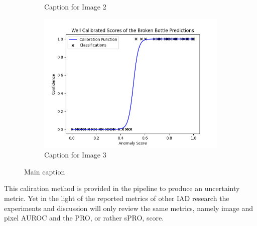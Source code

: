 \begin{figure}[htbp]
\begin{subfigure}[b]{0.3\textwidth}
        \caption{Caption for Image 2}
        \label{fig:sub2}
    \end{subfigure}
    \begin{subfigure}[b]{0.3\textwidth}
        \includegraphics[width=\textwidth]{figures/anomaly_calibration_soft.png}
        \caption{Caption for Image 3}
        \label{fig:sub3}
    \end{subfigure}
    \caption{Main caption}
    \label{fig:main}
\end{figure}

This caliration method is provided in the pipeline to produce an uncertainty metric. Yet in the light of the reported metrics of other IAD research the experiments and discussion will only 
review the same metrics, namely image and pixel AUROC and the PRO, or rather sPRO, score.








